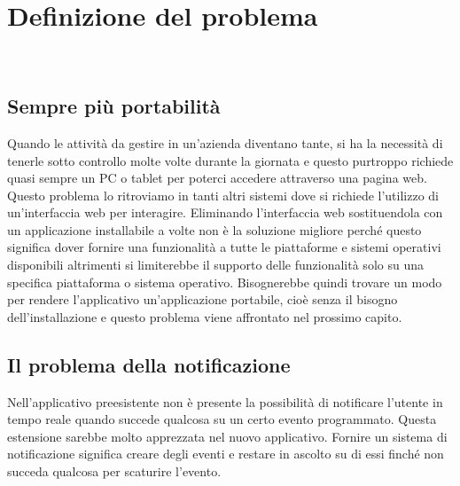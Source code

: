 
\chapter{Definizione del problema}
\label{cap:definizione-problema}

\\



\section{Sempre più portabilità}


Quando le attività da gestire in un'azienda diventano tante, si ha la necessità di tenerle sotto controllo molte volte durante la giornata e questo purtroppo richiede quasi sempre un PC o tablet per poterci accedere attraverso una pagina web. Questo problema lo ritroviamo in tanti altri sistemi dove si richiede l'utilizzo di un'interfaccia web per interagire. Eliminando l'interfaccia web sostituendola con un applicazione installabile a volte non è la soluzione migliore perché questo significa dover fornire una funzionalità a tutte le piattaforme e sistemi operativi disponibili altrimenti si  limiterebbe il supporto delle funzionalità solo su una specifica piattaforma o sistema operativo. Bisognerebbe quindi trovare un modo per rendere l'applicativo un'applicazione portabile, cioè senza il bisogno dell'installazione e questo problema viene affrontato nel prossimo capito.

\section{Il problema della notificazione}

Nell'applicativo preesistente non è presente  la possibilità di notificare l'utente in tempo reale quando succede qualcosa su un certo evento programmato.  Questa estensione sarebbe molto apprezzata nel nuovo applicativo. Fornire un sistema di notificazione significa creare degli eventi e restare in ascolto su di essi finché non succeda qualcosa per scaturire l'evento. \\

